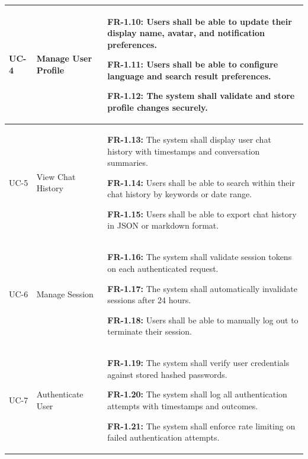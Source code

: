 \begin{longtable}{|>{\raggedright\arraybackslash}p{}|>{\raggedright\arraybackslash}p{}|>{\raggedright\arraybackslash}p{}|}
UC-4 & Manage User Profile &
\begin{frequirements}
\item \textbf{FR-1.10:} Users shall be able to update their display name, avatar, and notification preferences.
\item \textbf{FR-1.11:} Users shall be able to configure language and search result preferences.
\item \textbf{FR-1.12:} The system shall validate and store profile changes securely.
\end{frequirements} \\
\hline

UC-5 & View Chat History &
\begin{frequirements}
\item \textbf{FR-1.13:} The system shall display user chat history with timestamps and conversation summaries.
\item \textbf{FR-1.14:} Users shall be able to search within their chat history by keywords or date range.
\item \textbf{FR-1.15:} Users shall be able to export chat history in JSON or markdown format.
\end{frequirements} \\
\hline

UC-6 & Manage Session &
\begin{frequirements}
\item \textbf{FR-1.16:} The system shall validate session tokens on each authenticated request.
\item \textbf{FR-1.17:} The system shall automatically invalidate sessions after 24 hours.
\item \textbf{FR-1.18:} Users shall be able to manually log out to terminate their session.
\end{frequirements} \\
\hline

UC-7 & Authenticate User &
\begin{frequirements}
\item \textbf{FR-1.19:} The system shall verify user credentials against stored hashed passwords.
\item \textbf{FR-1.20:} The system shall log all authentication attempts with timestamps and outcomes.
\item \textbf{FR-1.21:} The system shall enforce rate limiting on failed authentication attempts.
\end{frequirements} \\
\hline


\end{longtable}
